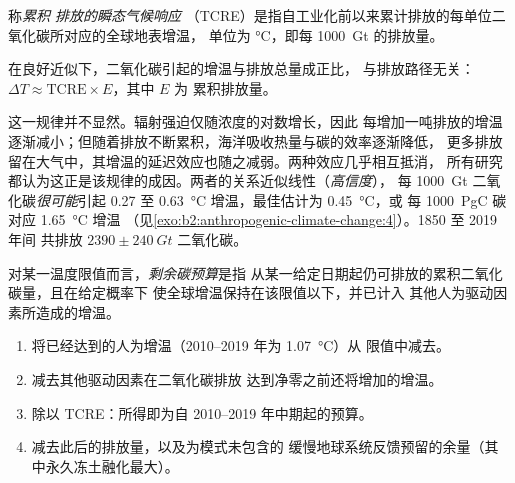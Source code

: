 \begin{definition}[累积 CO$_2$ 排放的瞬态气候响应]\label{def:b2:anthropogenic-climate-change:tcre}
称\emph{累积  排放的瞬态气候响应}
（TCRE）是指自工业化前以来累计排放的每单位二氧化碳所对应的全球地表增温，
单位为 \unit{\celsius}，即每
\qty{1000}{Gt}  的排放量。
\end{definition}

\begin{proposition}[增温遵循累积排放]\label{prop:b2:anthropogenic-climate-change:tcre}
在良好近似下，二氧化碳引起的增温与排放总量成正比，
与排放路径无关：$\Delta T \approx \text{TCRE} \times E$，其中 $E$ 为
累积排放量。
\end{proposition}
\admitted

这一规律并不显然。辐射强迫仅随浓度的对数增长，因此
每增加一吨排放的增温逐渐减小；但随着排放不断累积，海洋吸收热量与碳的效率逐渐降低，
更多排放留在大气中，其增温的延迟效应也随之减弱。两种效应几乎相互抵消，
所有研究都认为这正是该规律的成因。两者的关系近似线性（\emph{高信度}），
每 \qty{1000}{Gt} 二氧化碳\emph{很可能}引起 0.27 至 \qty{0.63}{\celsius} 增温，最佳估计为 \qty{0.45}{\celsius}，或
每 \qty{1000}{PgC} 碳对应 \qty{1.65}{\celsius} 增温
（见\cref{exo:b2:anthropogenic-climate-change:4}）。1850 至 2019 年间
共排放 $\num{2390} \pm \qty{240}{Gt}$ 二氧化碳。

\begin{definition}[剩余碳预算]\label{def:b2:anthropogenic-climate-change:budget}
对某一温度限值而言，\emph{剩余碳预算}是指
从某一给定日期起仍可排放的累积二氧化碳量，且在给定概率下
使全球增温保持在该限值以下，并已计入
其他人为驱动因素所造成的增温。
\end{definition}

\begin{method}\label{met:b2:anthropogenic-climate-change:budget}
\begin{enumerate}
  \item 将已经达到的人为增温（2010--2019 年为 \qty{1.07}{\celsius}）从
        限值中减去。
  \item 减去其他驱动因素在二氧化碳排放
        达到净零之前还将增加的增温。
  \item 除以 TCRE：所得即为自 2010--2019 年中期起的预算。
  \item 减去此后的排放量，以及为模式未包含的
        缓慢地球系统反馈预留的余量（其中永久冻土融化最大）。
\end{enumerate}
\end{method}


